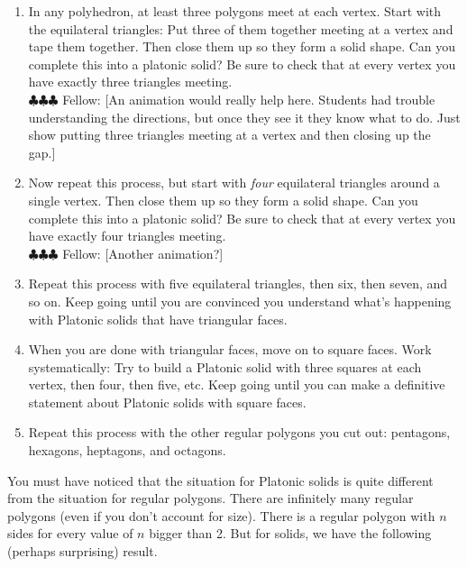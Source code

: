 \documentclass[12pt, reqno]{amsart}
\theoremstyle{remark}
\theoremstyle{definition}
\numberwithin{equation}{section}  %
\newcommand{\fellow}[1]{{\color{magenta} \sf $\clubsuit\clubsuit\clubsuit$ Fellow: [#1]}}
\begin{document}
\begin{enumerate}
\item
In any polyhedron, at least three polygons meet at each vertex.  Start with the equilateral triangles: Put three of them together meeting at a vertex and tape them together.  Then close them up so they form a solid shape.  Can you complete this into a platonic solid?  Be sure to check that at every vertex you have exactly three triangles meeting.\\

\fellow{An animation would really help here.  Students had trouble understanding the directions, but once they see it they know what to do.  Just show putting three triangles meeting at a vertex and then closing up the gap.}

\item
Now repeat this process, but start with \emph{four} equilateral triangles around a single vertex.  Then close them up so they form a solid shape.  Can you complete this into a platonic solid?  Be sure to check that at every vertex you have exactly four triangles meeting.\\

\fellow{Another animation?}


\item
Repeat this process with five equilateral triangles, then six, then seven, and so on.  Keep going until you are convinced you understand what's happening with Platonic solids that have triangular faces.\\

\item
When you are done with triangular faces, move on to square faces. Work systematically: Try  to build a Platonic solid with three squares at each vertex, then four, then five, etc.  Keep going until you can make a definitive statement about Platonic solids with square faces.\\

\item
Repeat this process with the other regular polygons you cut out: pentagons, hexagons, heptagons, and octagons.  
\end{enumerate}

\bigskip
\bigskip


You must have noticed that the situation for Platonic solids is quite different from the situation for regular polygons.  There are infinitely many regular polygons (even if you don't account for size).  There is a regular polygon with $n$ sides for every value of $n$ bigger than 2.  But for solids, we have the following (perhaps surprising) result.
\end{document}
